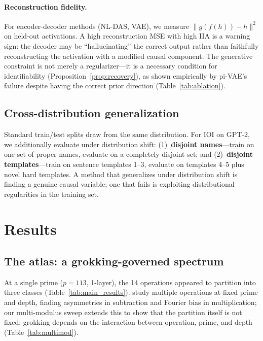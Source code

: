 \documentclass{article}
\begin{document}
\paragraph{Reconstruction fidelity.}
For encoder-decoder methods (NL-DAS, VAE), we measure $\|g(f(h)) - h\|^2$ on
held-out activations. A high reconstruction MSE with high IIA is a warning sign:
the decoder may be ``hallucinating'' the correct output rather than faithfully
reconstructing the activation with a modified causal component.
The generative constraint is not merely a regularizer---it is a necessary
condition for identifiability (Proposition~\ref{prop:recovery}), as shown
empirically by pi-VAE's failure despite having the correct prior direction
(Table~\ref{tab:ablation}).

\subsection{Cross-distribution generalization}
\label{sec:cross_distribution}

Standard train/test splits draw from the same distribution. For IOI on GPT-2, we
additionally evaluate under distribution shift: (1)~\textbf{disjoint names}---train
on one set of proper names, evaluate on a completely disjoint set; and
(2)~\textbf{disjoint templates}---train on sentence templates 1--3, evaluate on
templates 4--5 plus novel hard templates. A method that generalizes under
distribution shift is finding a genuine causal variable; one that fails is
exploiting distributional regularities in the training set.


\section{Results}
\label{sec:results}

\subsection{The atlas: a grokking-governed spectrum}

At a single prime ($p{=}113$, 1-layer), the 14 operations appeared to partition
into three classes (Table~\ref{tab:main_results}).
\citet{furuta2024modular} study multiple operations at fixed prime and depth,
finding asymmetries in subtraction and Fourier bias in multiplication; our
multi-modulus sweep extends this to show that the partition itself is not fixed:
grokking depends on the interaction between operation, prime, and depth
(Table~\ref{tab:multimod}).
\end{document}
